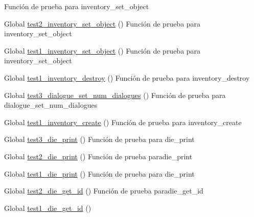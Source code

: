 \begin{DoxyRefList}
%
Función de prueba para inventory\+\_\+set\+\_\+object  
\item[Global \mbox{\hyperlink{inventory__test_8c_ac6a46ad895e30089d52ed81d2f7d32c4}{test2\+\_\+inventory\+\_\+set\+\_\+object}} ()]\label{test__test000069}%
%
Función de prueba para inventory\+\_\+set\+\_\+object  
\item[Global \mbox{\hyperlink{inventory__test_8c_a68cdc4960d6ba206a27e71f82486ecd5}{test1\+\_\+inventory\+\_\+set\+\_\+object}} ()]\label{test__test000068}%
%
Función de prueba para inventory\+\_\+set\+\_\+object  
\item[Global \mbox{\hyperlink{inventory__test_8c_ab161eafe6a61db39b2237e97c677d822}{test1\+\_\+inventory\+\_\+destroy}} ()]\label{test__test000067}%
%
Función de prueba para inventory\+\_\+destroy  
\item[Global \mbox{\hyperlink{dialogue__test_8c_a00f4fd6f3f897dca58d39ab3c1807759}{test3\+\_\+dialogue\+\_\+set\+\_\+num\+\_\+dialogues}} ()]\label{test__test000038}%
%
Función de prueba para dialogue\+\_\+set\+\_\+num\+\_\+dialogues  
\item[Global \mbox{\hyperlink{inventory__test_8c_a33638f1a88ae16ab8d6bee00145b82b8}{test1\+\_\+inventory\+\_\+create}} ()]\label{test__test000065}%
%
Función de prueba para inventory\+\_\+create  
\item[Global \mbox{\hyperlink{die__test_8c_a62332d2e0e931c7f9be50ae465157911}{test3\+\_\+die\+\_\+print}} ()]\label{test__test000064}%
%
Función de prueba para die\+\_\+print  
\item[Global \mbox{\hyperlink{die__test_8c_a5bf5f30b38f256efc0c6e91ef538f5f1}{test2\+\_\+die\+\_\+print}} ()]\label{test__test000063}%
%
Función de prueba paradie\+\_\+print  
\item[Global \mbox{\hyperlink{die__test_8c_a4cd7590bbb2edca1414f083ba74ec542}{test1\+\_\+die\+\_\+print}} ()]\label{test__test000062}%
%
Función de prueba para die\+\_\+print  
\item[Global \mbox{\hyperlink{die__test_8c_a9c76572bbb86ca9138b99a010e6a184a}{test2\+\_\+die\+\_\+get\+\_\+id}} ()]\label{test__test000061}%
%
Función de prueba paradie\+\_\+get\+\_\+id  
\item[Global \mbox{\hyperlink{die__test_8c_ad27d80a80c4b4fa108337135d5633c90}{test1\+\_\+die\+\_\+get\+\_\+id}} ()]\label{test__test000060}%

\end{DoxyRefList}
